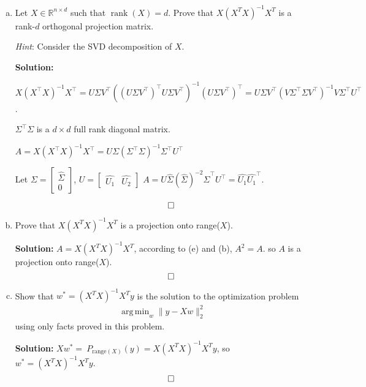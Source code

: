\documentclass{article}
\DeclareMathOperator{\rank}{\mathrm{rank}}
\DeclareMathOperator*{\argmin}{arg\,min}
\newenvironment{solution}{\color{blue} \smallskip \textbf{Solution:}}{}
\begin{document}
\begin{enumerate}[(a)]
\begin{solution}
    	Similarly, $\text{Row}(X) = \text{Col}(X^\top)$, so
        $\{v_i : \sigma_i > 0\}$ is an orthonormal basis for the row space of $X$.

        \[ \qedhere \]

    \end{solution}

    \item Let $X \in \mathbb{R}^{n \times d}$ such that $\rank(X) = d$. Prove that $X(X^{T}X)^{-1}X^{T}$ is a rank-$d$ orthogonal projection matrix. 
    
    \emph{Hint}: Consider the SVD decomposition of $X$. 
    
    \begin{solution}
        
        $ X(X^{\top}X)^{-1}X^{\top} = U\Sigma V^\top((U\Sigma V^\top)^{\top}U\Sigma V^\top)^{-1}(U\Sigma V^\top)^{\top} = 
        U\Sigma V^\top(V\Sigma^\top \Sigma V^\top)^{-1}V\Sigma^\top U^\top$.

        $\Sigma^\top \Sigma$ is a $d \times d$ full rank diagonal matrix.

        $A = X(X^{\top}X)^{-1}X^{\top} = U\Sigma (\Sigma^\top \Sigma)^{-1}\Sigma^\top U^\top
        $

        Let $\Sigma = \begin{bmatrix} \hat{\Sigma} \\ 0 \end{bmatrix}$, 
        $U = \begin{bmatrix}
            \hat{U_1} & \hat{U_2}
        \end{bmatrix}$
        $A = U\hat{\Sigma} (\hat{\Sigma})^{-2}\hat{\Sigma}^\top U^\top = \hat{U_1}\hat{U_1}^\top$.

        \[ \qedhere \]
    \end{solution}

    \item
    Prove that $X(X^{T}X)^{-1}X^{T}$ is a projection onto range($X$).
    
    \begin{solution}
        $A = X(X^{T}X)^{-1}X^{T}$, according to (e) and (b), $A^2 = A$. so $A$ is a projection onto range($X$).
        \[ \qedhere \]
    \end{solution}

    \newpage
    \item
    Show that $w^{*} = (X^{T}X)^{-1}X^{T}y$ is the solution to the optimization problem
    \begin{align*}
        \argmin_{w} \|y - Xw\|_{2}^{2}
    \end{align*}
    using only facts proved in this problem.
    
    \begin{solution}
        $Xw^{*} = \displaystyle \ P_{\text{range}(X)}(y) = X(X^{T}X)^{-1}X^{T}y$, so $w^{*} = (X^{T}X)^{-1}X^{T}y$.
        \[ \qedhere \]
    \end{solution}

\end{enumerate}
\end{document}
